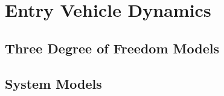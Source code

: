 \chapter{Entry Vehicle Dynamics}
\section{Three Degree of Freedom Models}

\section{System Models}


